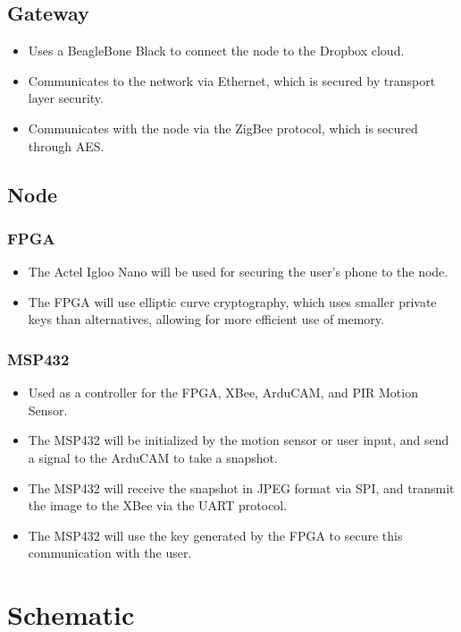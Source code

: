 \documentclass[11pt]{article}
\begin{document}
\subsection{Gateway}
\begin{itemize}
\item Uses a BeagleBone Black to connect the node to the Dropbox cloud.
\item Communicates to the network via Ethernet, which is secured by transport layer security.
\item Communicates with the node via the ZigBee protocol, which is secured through AES.
\end{itemize}


\subsection{Node}
\subsubsection{FPGA}
\begin{itemize}
\item The Actel Igloo Nano will be used for securing the user's phone to the node.  
\item The FPGA will use elliptic curve cryptography, which uses smaller private keys than alternatives, allowing for more efficient use of memory.
\end{itemize}


 \subsubsection{MSP432}
 \begin{itemize}
 \item Used as a controller for the FPGA, XBee, ArduCAM, and PIR Motion Sensor.
 \item The MSP432 will be initialized by the motion sensor or user input, and send a signal to the ArduCAM to take a snapshot.
 \item The MSP432 will receive the snapshot in JPEG format via SPI, and transmit the image to the XBee via the UART protocol.
 \item The MSP432 will use the key generated by the FPGA to secure this communication with the user.
 \end{itemize}
 

\section*{Schematic}
\end{document}
